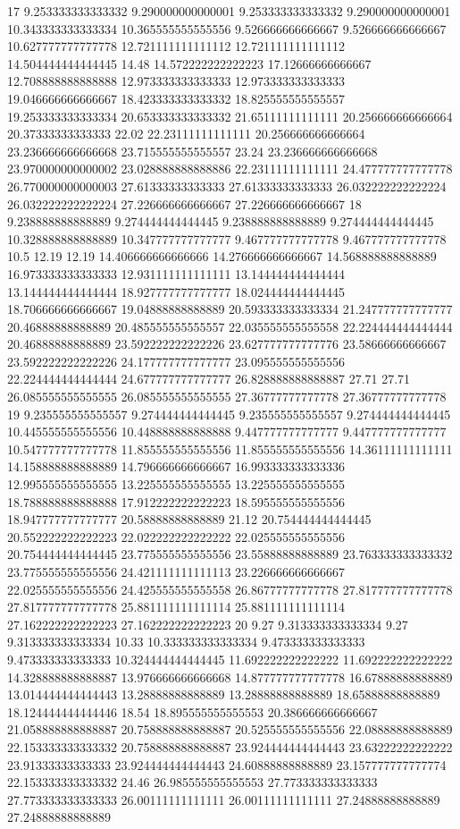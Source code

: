 17 9.253333333333332 9.290000000000001 9.253333333333332 9.290000000000001 10.343333333333334 10.365555555555556 9.526666666666667 9.526666666666667 10.627777777777778 12.721111111111112 12.721111111111112 14.504444444444445 14.48 14.572222222222223 17.12666666666667 12.708888888888888 12.973333333333333 12.973333333333333 19.046666666666667 18.423333333333332 18.825555555555557 19.253333333333334 20.653333333333332 21.65111111111111 20.256666666666664 20.37333333333333 22.02 22.23111111111111 20.256666666666664 23.236666666666668 23.715555555555557 23.24 23.236666666666668 23.970000000000002 23.028888888888886 22.23111111111111 24.477777777777778 26.770000000000003 27.61333333333333 27.61333333333333 26.032222222222224 26.032222222222224 27.226666666666667 27.226666666666667
18 9.238888888888889 9.274444444444445 9.238888888888889 9.274444444444445 10.328888888888889 10.347777777777777 9.467777777777778 9.467777777777778 10.5 12.19 12.19 14.406666666666666 14.276666666666667 14.568888888888889 16.973333333333333 12.931111111111111 13.144444444444444 13.144444444444444 18.927777777777777 18.024444444444445 18.706666666666667 19.04888888888889 20.593333333333334 21.247777777777777 20.46888888888889 20.485555555555557 22.035555555555558 22.224444444444444 20.46888888888889 23.592222222222226 23.627777777777776 23.58666666666667 23.592222222222226 24.177777777777777 23.095555555555556 22.224444444444444 24.677777777777777 26.828888888888887 27.71 27.71 26.085555555555555 26.085555555555555 27.36777777777778 27.36777777777778
19 9.235555555555557 9.274444444444445 9.235555555555557 9.274444444444445 10.445555555555556 10.448888888888888 9.447777777777777 9.447777777777777 10.547777777777778 11.855555555555556 11.855555555555556 14.36111111111111 14.158888888888889 14.796666666666667 16.993333333333336 12.995555555555555 13.225555555555555 13.225555555555555 18.788888888888888 17.912222222222223 18.595555555555556 18.947777777777777 20.58888888888889 21.12 20.754444444444445 20.552222222222223 22.022222222222222 22.025555555555556 20.754444444444445 23.775555555555556 23.55888888888889 23.763333333333332 23.775555555555556 24.421111111111113 23.226666666666667 22.025555555555556 24.425555555555558 26.86777777777778 27.817777777777778 27.817777777777778 25.881111111111114 25.881111111111114 27.162222222222223 27.162222222222223
20 9.27 9.313333333333334 9.27 9.313333333333334 10.33 10.333333333333334 9.473333333333333 9.473333333333333 10.324444444444445 11.692222222222222 11.692222222222222 14.328888888888887 13.976666666666668 14.877777777777778 16.67888888888889 13.014444444444443 13.28888888888889 13.28888888888889 18.65888888888889 18.124444444444446 18.54 18.895555555555553 20.386666666666667 21.058888888888887 20.758888888888887 20.525555555555556 22.08888888888889 22.153333333333332 20.758888888888887 23.924444444444443 23.63222222222222 23.91333333333333 23.924444444444443 24.60888888888889 23.157777777777774 22.153333333333332 24.46 26.985555555555553 27.773333333333333 27.773333333333333 26.00111111111111 26.00111111111111 27.24888888888889 27.24888888888889
